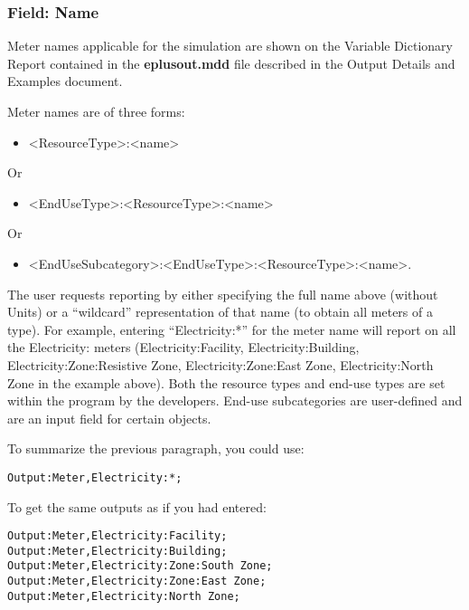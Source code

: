\subsubsection{Field: Name}\label{field-name-1-036}

Meter names applicable for the simulation are shown on the Variable Dictionary Report contained in the \textbf{eplusout.mdd} file described in the Output Details and Examples document.

Meter names are of three forms:

\begin{itemize}
\tightlist
\item
  \textless{}ResourceType\textgreater{}:\textless{}name\textgreater{}
\end{itemize}

Or

\begin{itemize}
\tightlist
\item
  \textless{}EndUseType\textgreater{}:\textless{}ResourceType\textgreater{}:\textless{}name\textgreater{}
\end{itemize}

Or

\begin{itemize}
\tightlist
\item
  \textless{}EndUseSubcategory\textgreater{}:\textless{}EndUseType\textgreater{}:\textless{}ResourceType\textgreater{}:\textless{}name\textgreater{}.
\end{itemize}

The user requests reporting by either specifying the full name above (without Units) or a ``wildcard'' representation of that name (to obtain all meters of a type). For example, entering ``Electricity:*'' for the meter name will report on all the Electricity: meters (Electricity:Facility, Electricity:Building, Electricity:Zone:Resistive Zone, Electricity:Zone:East Zone, Electricity:North Zone in the example above). Both the resource types and end-use types are set within the program by the developers. End-use subcategories are user-defined and are an input field for certain objects.

To summarize the previous paragraph, you could use:

\begin{lstlisting}
Output:Meter,Electricity:*;
\end{lstlisting}

To get the same outputs as if you had entered:

\begin{lstlisting}
Output:Meter,Electricity:Facility;
Output:Meter,Electricity:Building;
Output:Meter,Electricity:Zone:South Zone;
Output:Meter,Electricity:Zone:East Zone;
Output:Meter,Electricity:North Zone;
\end{lstlisting}

